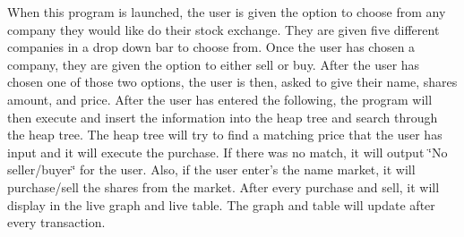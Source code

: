 When this program is launched, the user is given the option to choose from any company they would like do their stock exchange. They are given five different companies in a drop down bar to choose from. Once the user has chosen a company, they are given the option to either sell or buy. After the user has chosen one of those two options, the user is then, asked to give their name, shares amount, and price. After the user has entered the following, the program will then execute and insert the information into the heap tree and search through the heap tree. The heap tree will try to find a matching price that the user has input and it will execute the purchase. If there was no match, it will output \char`\"{}\+No seller/buyer\char`\"{} for the user. Also, if the user enter's the name market, it will purchase/sell the shares from the market. After every purchase and sell, it will display in the live graph and live table. The graph and table will update after every transaction. 